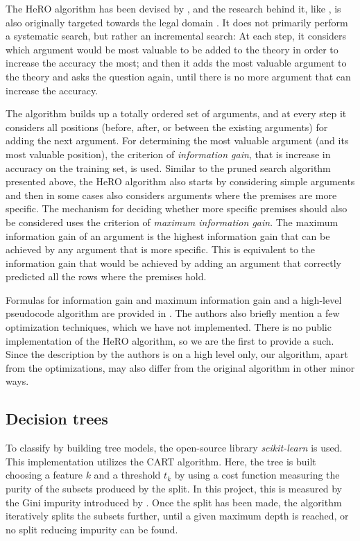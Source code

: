 The HeRO algorithm has been devised by \cite{johnstonAlgorithmInductionDefeasible2003}, and the research behind it, like \cite{verheijProofProbabilities2017}, is also originally targeted towards the legal domain \citep{johnstonInductionDefeasibleLogic2003}. It does not primarily perform a systematic search, but rather an incremental search: At each step, it considers which argument would be most valuable to be added to the theory in order to increase the accuracy the most; and then it adds the most valuable argument to the theory and asks the question again, until there is no more argument that can increase the accuracy. 

The algorithm builds up a totally ordered set of arguments, and at every step it considers all positions (before, after, or between the existing arguments) for adding the next argument. For determining the most valuable argument (and its most valuable position), the criterion of \textit{information gain}, that is increase in accuracy on the training set, is used. Similar to the pruned search algorithm presented above, the HeRO algorithm also starts by considering simple arguments and then in some cases also considers arguments where the premises are more specific. The mechanism for deciding whether more specific premises should also be considered uses the criterion of \textit{maximum information gain}. The maximum information gain of an argument is the highest information gain that can be achieved by any argument that is more specific. This is equivalent to the information gain that would be achieved by adding an argument that correctly predicted all the rows where the premises hold. 

Formulas for information gain and maximum information gain and a high-level pseudocode algorithm are provided in \cite{johnstonAlgorithmInductionDefeasible2003}. The authors also briefly mention a few optimization techniques, which we have not implemented. There is no public implementation of the HeRO algorithm, so we are the first to provide a such. Since the description by the authors is on a high level only, our algorithm, apart from the optimizations, may also differ from the original algorithm in other minor ways. 

\label{dectrees-meth}
\subsection{Decision trees}

To classify by building tree models, the open-source library \textit{scikit-learn} \citep{pedregosa2011scikit} is used. This implementation utilizes the CART \citep{DecTreePaper} algorithm. Here, the tree is built choosing a feature $k$ and a threshold $t_k$ by using a cost function measuring the purity of the subsets produced by the split. In this project, this is measured by the Gini impurity introduced by \citet{DecTreePaper}. Once the split has been made, the algorithm iteratively splits the subsets further, until a given maximum depth is reached, or no split reducing impurity can be found.

